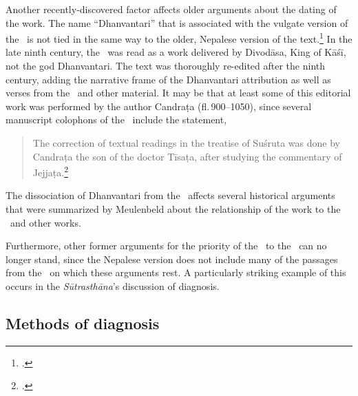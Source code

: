 Another recently-discovered factor affects older arguments about the
dating of the work. The name “Dhanvantari” that is associated with the
vulgate version of the \SS\ is not tied in the same way to the older,
Nepalese version of the
text.\footnote{\cites{birc-2021,wuja-2013,birc-2021a,wuja-2023}.} In
    the late ninth century, the \SS\ was read as a work delivered by
    Divodāsa, King of Kāśī, not the god Dhanvantari.  The text was
    thoroughly re-edited after the ninth century, adding the narrative
    frame of the Dhanvantari attribution as well as verses from the \CS\
    and other material.  It may be that at least some of this editorial
    work was performed by the author Candraṭa (fl.\,900--1050), since
    several manuscript colophons of the \SS\ include the statement,
    \begin{quote}
        The correction of textual readings in the treatise of Suśruta
        was done by Candraṭa the son of the doctor Tīsaṭa, after
        studying the commentary of Jejjaṭa.\footcite{wuja-2025g}
    \end{quote}
    The dissociation of Dhanvantari from the \SS\ affects several
historical arguments that were summarized by Meulenbeld about the
relationship of the work to the \CS\ and other works.  

Furthermore, other former arguments for the priority of the \CS\
to the \SS\ can no longer stand, since the Nepalese version does not
include many of the passages from the \CS\ on which these arguments
rest.  A particularly striking example of this occurs in the
\textit{Sūtrasthāna}'s discussion of diagnosis.

\subsection{Methods of diagnosis}

